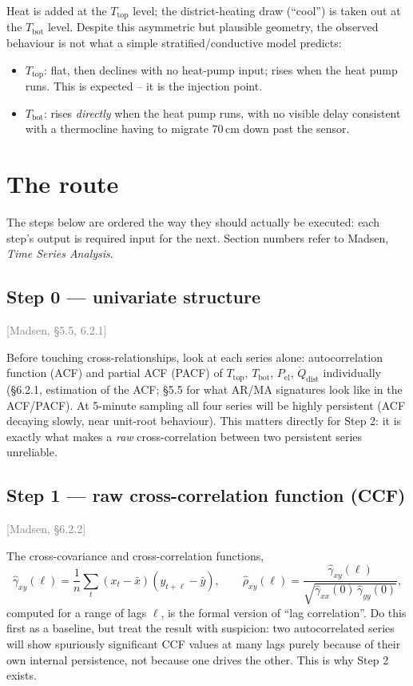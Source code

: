 \documentclass[11pt]{article}
\newcommand{\madsen}[1]{\textcolor{gray}{[Madsen, \S#1]}}
\begin{document}
Heat is added at the $T_{\text{top}}$ level; the district-heating draw
(``cool'') is taken out at the $T_{\text{bot}}$ level. Despite this
asymmetric but plausible geometry, the observed behaviour is not what a
simple stratified/conductive model predicts:

\begin{itemize}
\item $T_{\text{top}}$: flat, then declines with no heat-pump input; rises
  when the heat pump runs. This is expected -- it is the injection point.
\item $T_{\text{bot}}$: rises \emph{directly} when the heat pump runs, with
  no visible delay consistent with a thermocline having to migrate 70\,cm
  down past the sensor.
\end{itemize}

\section{The route}

The steps below are ordered the way they should actually be executed: each
step's output is required input for the next. Section numbers refer to
Madsen, \emph{Time Series Analysis}.

\subsection*{Step 0 --- univariate structure} \madsen{5.5, 6.2.1}

Before touching cross-relationships, look at each series alone:
autocorrelation function (ACF) and partial ACF (PACF) of $T_{\text{top}}$,
$T_{\text{bot}}$, $P_{\text{el}}$, $\dot Q_{\text{dist}}$ individually
(\S6.2.1, estimation of the ACF; \S5.5 for what AR/MA signatures look like in
the ACF/PACF). At 5-minute sampling all four series will be highly
persistent (ACF decaying slowly, near unit-root behaviour). This matters
directly for Step 2: it is exactly what makes a \emph{raw} cross-correlation
between two persistent series unreliable.

\subsection*{Step 1 --- raw cross-correlation function (CCF)} \madsen{6.2.2}

The cross-covariance and cross-correlation functions,
\[
  \hat\gamma_{xy}(\ell) = \frac{1}{n}\sum_{t} (x_t - \bar x)(y_{t+\ell} -
  \bar y), \qquad
  \hat\rho_{xy}(\ell) = \frac{\hat\gamma_{xy}(\ell)}{\sqrt{\hat\gamma_{xx}(0)\,
  \hat\gamma_{yy}(0)}},
\]
computed for a range of lags $\ell$, is the formal version of ``lag
correlation''. Do this first as a baseline, but treat the result with
suspicion: two autocorrelated series will show spuriously significant CCF
values at many lags purely because of their own internal persistence, not
because one drives the other. This is why Step 2 exists.
\end{document}
